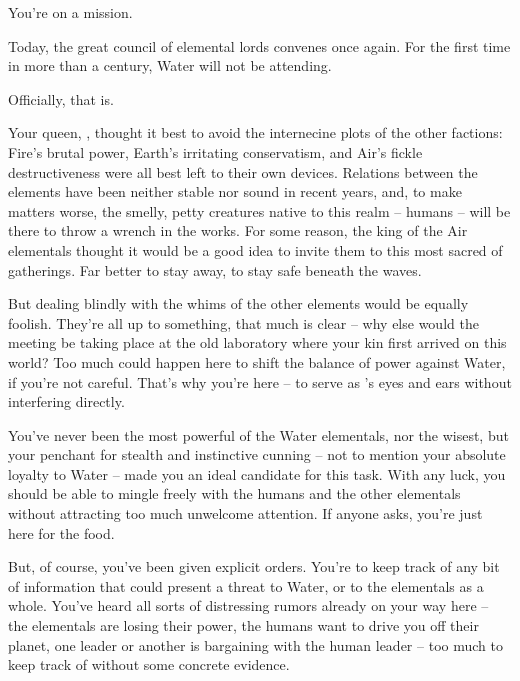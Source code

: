 \documentclass[char]{elementals}
\begin{document}
\name{\cMiniWater{}}


You're on a mission. 

Today, the great council of elemental lords convenes once again. For the first time in more than a century, Water will not be attending.

Officially, that is.

Your queen, \cWaterQueen{}, thought it best to avoid the internecine plots of the other factions: Fire's brutal power, Earth's irritating conservatism, and Air's fickle destructiveness were all best left to their own devices. Relations between the elements have been neither stable nor sound in recent years, and, to make matters worse, the smelly, petty creatures native to this realm -- humans -- will be there to throw a wrench in the works. For some reason, the king of the Air elementals thought it would be a good idea to invite them to this most sacred of gatherings. Far better to stay away, to stay safe beneath the waves.

But dealing blindly with the whims of the other elements would be equally foolish. They're all up to something, that much is clear -- why else would the meeting be taking place at the old laboratory where your kin first arrived on this world? Too much could happen here to shift the balance of power against Water, if you're not careful. That's why you're here -- to serve as \cWaterQueen{}'s eyes and ears without interfering directly.

You've never been the most powerful of the Water elementals, nor the wisest, but your penchant for stealth and instinctive cunning -- not to mention your absolute loyalty to Water -- made you an ideal candidate for this task. With any luck, you should be able to mingle freely with the humans and the other elementals without attracting too much unwelcome attention. If anyone asks, you're just here for the food.

But, of course, you've been given explicit orders. You're to keep track of any bit of information that could present a threat to Water, or to the elementals as a whole. You've heard all sorts of distressing rumors already on your way here -- the elementals are losing their power, the humans want to drive you off their planet, one leader or another is bargaining with the human leader -- too much to keep track of without some concrete evidence.
\end{document}

